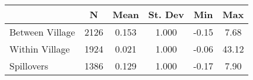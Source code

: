 \begin{tabular}{l*{5}{c}}\hline&\multicolumn{1}{c}{N}&\multicolumn{1}{c}{Mean}&\multicolumn{1}{c}{St. Dev}&\multicolumn{1}{c}{Min}&\multicolumn{1}{c}{Max}\\ \hline 
Between Village & 2126 & 0.153 & 1.000 & -0.15 & 7.68 \\
Within Village & 1924 & 0.021 & 1.000 & -0.06 & 43.12 \\
Spillovers & 1386 & 0.129 & 1.000 & -0.17 & 7.90 \\
\hline \end{tabular}
